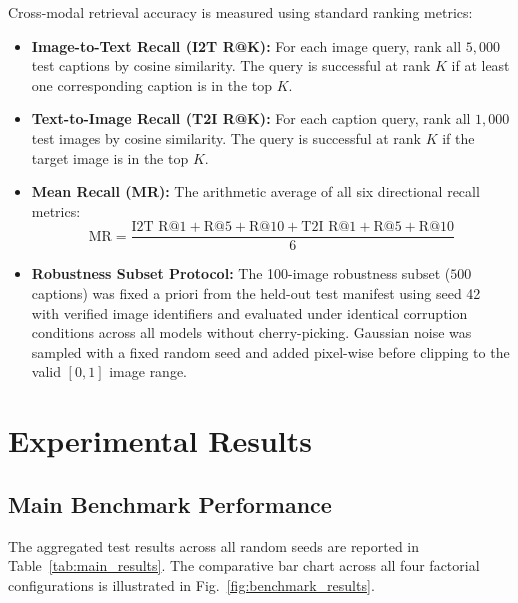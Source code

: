 \documentclass[journal]{IEEEtran}
\begin{document}
Cross-modal retrieval accuracy is measured using standard ranking metrics:
\begin{itemize}
    \item \textbf{Image-to-Text Recall (I2T R@K):} For each image query, rank all $5{,}000$ test captions by cosine similarity. The query is successful at rank $K$ if at least one corresponding caption is in the top $K$.
    \item \textbf{Text-to-Image Recall (T2I R@K):} For each caption query, rank all $1{,}000$ test images by cosine similarity. The query is successful at rank $K$ if the target image is in the top $K$.
    \item \textbf{Mean Recall (MR):} The arithmetic average of all six directional recall metrics:
    \begin{equation}
    \text{MR} = \frac{\text{I2T R@1} + \text{R@5} + \text{R@10} + \text{T2I R@1} + \text{R@5} + \text{R@10}}{6}
    \end{equation}
    \item \textbf{Robustness Subset Protocol:} The 100-image robustness subset ($500$ captions) was fixed a priori from the held-out test manifest using seed 42 with verified image identifiers and evaluated under identical corruption conditions across all models without cherry-picking. Gaussian noise was sampled with a fixed random seed and added pixel-wise before clipping to the valid $[0, 1]$ image range.
\end{itemize}

\section{Experimental Results}
\label{sec:results}

\subsection{Main Benchmark Performance}
The aggregated test results across all random seeds are reported in Table~\ref{tab:main_results}. The comparative bar chart across all four factorial configurations is illustrated in Fig.~\ref{fig:benchmark_results}.
\end{document}
